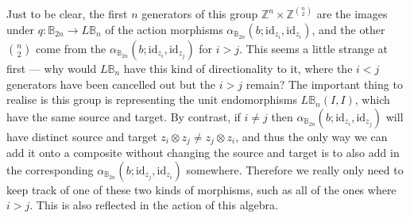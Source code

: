 \documentclass{amsbook} %
\newcommand{\id}{\textrm{id}}
\numberwithin{section}{chapter}
\begin{document}
Just to be clear, the first $n$ generators of this group $\mathbb{Z}^{n} \times \mathbb{Z}^{{n}\choose{2}}$ are the images under $q \colon  \mathbb{B}_{2n} \to L\mathbb{B}_n$ of the action morphisms $\alpha_{\mathbb{B}_{2n}}(b;\id_{z_i},\id_{z_i})$, and the other ${n}\choose{2}$ come from the $\alpha_{\mathbb{B}_{2n}}(b;\id_{z_i},\id_{z_j})$ for $i > j$. This seems a little strange at first --- why would $L\mathbb{B}_n$ have this kind of directionality to it, where the $i<j$ generators have been cancelled out but the $i > j$ remain? The important thing to realise is this group is representing the unit endomorphisms $L\mathbb{B}_n(I,I)$, which have the same source and target. By contrast, if $i \neq j$ then $\alpha_{\mathbb{B}_{2n}}(b;\id_{z_i},\id_{z_j})$ will have distinct source and target $z_i \otimes z_j \neq z_j \otimes z_i$, and thus the only way we can add it onto a composite without changing the source and target is to also add in the corresponding $\alpha_{\mathbb{B}_{2n}}(b;\id_{z_j},\id_{z_i})$ somewhere. Therefore we really only need to keep track of one of these two kinds of morphisms, such as all of the ones where $i > j$. This is also reflected in the action of this algebra.
\end{document}
